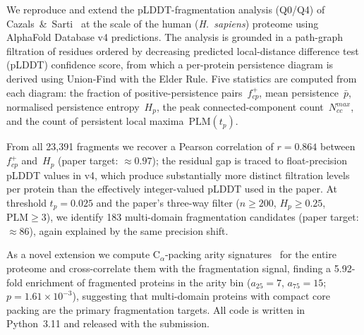 We reproduce and extend the pLDDT-fragmentation analysis (Q0/Q4) of
Cazals~\&~Sarti~\cite{cazals2025alphafold} at the scale of the human
(\textit{H.~sapiens}) proteome using AlphaFold Database v4 predictions.
The analysis is grounded in a path-graph filtration of residues ordered by
decreasing predicted local-distance difference test (pLDDT) confidence
score, from which a per-protein persistence diagram is derived using
Union-Find with the Elder Rule.
Five statistics are computed from each diagram: the fraction of
positive-persistence pairs~$f^+_{cp}$, mean persistence~$\bar{p}$,
normalised persistence entropy~$H_p$, the peak connected-component
count~$N_{cc}^{max}$, and the count of persistent local maxima~$\mathrm{PLM}(t_p)$.

From all 23{,}391 fragments we recover a Pearson correlation of
$r = 0.864$ between $f^+_{cp}$ and~$H_p$ (paper target:
${\approx}0.97$); the residual gap is traced
to float-precision pLDDT values in v4, which produce substantially more
distinct filtration levels per protein than the effectively integer-valued
pLDDT used in the paper.
At threshold $t_p = 0.025$ and the paper's three-way filter
($n \ge 200$, $H_p \ge 0.25$, $\mathrm{PLM} \ge 3$),
we identify 183 multi-domain fragmentation candidates
(paper target: ${\approx}86$), again explained by the same precision shift.

As a novel extension we compute $\mathrm{C}_\alpha$-packing arity
signatures~\cite{cazals2025alphafold} for the entire proteome and
cross-correlate them with the fragmentation signal,
finding a 5.92-fold enrichment of fragmented proteins in the arity bin
($a_{25}=7$, $a_{75}=15$; $p = 1.61 \times 10^{-3}$), suggesting
that multi-domain proteins with compact core packing are the primary
fragmentation targets.
All code is written in Python~3.11 and released with the submission.
